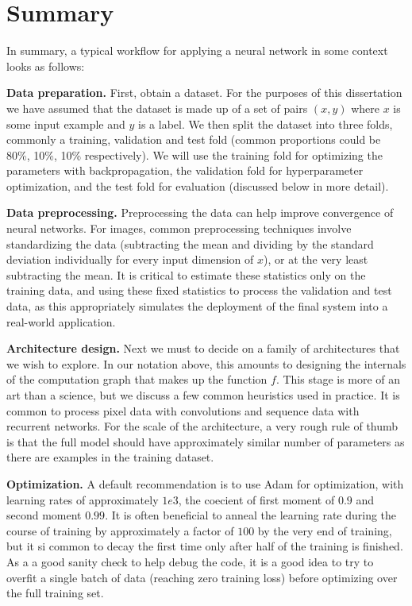 \section{Summary}
In summary, a typical workflow for applying a neural network in some context looks as follows:

\textbf{Data preparation.} First, obtain a dataset. For the purposes of this dissertation we have assumed that the dataset is made up of a set of pairs $\displaystyle (x, y)$ where $\displaystyle x$ is some input example and $\displaystyle y$ is a label. We then split the dataset into three folds, commonly a training, validation and test fold (common proportions could be 80\%, 10\%, 10\% respectively). We will use the training fold for optimizing the parameters with backpropagation, the validation fold for hyperparameter optimization, and the test fold for evaluation (discussed below in more detail).

\textbf{Data preprocessing.} Preprocessing the data can help improve convergence of neural networks. For images, common preprocessing techniques involve standardizing the data (subtracting the mean and dividing by the standard deviation individually for every input dimension of $\displaystyle x$), or at the very least subtracting the mean. It is critical to estimate these statistics only on the training data, and using these fixed statistics to process the validation and test data, as this appropriately simulates the deployment of the final system into a real-world application.

\textbf{Architecture design.} Next we must to decide on a family of architectures that we wish to explore. In our notation above, this amounts to designing the internals of the computation graph that makes up the function $\displaystyle f$. This stage is more of an art than a science, but we discuss a few common heuristics used in practice. It is common to process pixel data with convolutions and sequence data with recurrent networks. For the scale of the architecture, a very rough rule of thumb is that the full model should have approximately similar number of parameters as there are examples in the training dataset.

\textbf{Optimization.} A default recommendation is to use Adam \cite{article:Adam-optimization} for optimization, with learning rates of approximately $\displaystyle 1e3$, the coecient of first moment of $\displaystyle 0.9$ and second moment $\displaystyle 0.99$. It is often beneficial to anneal the learning rate during the course of training by approximately a factor of $\displaystyle 100$ by the very end of training, but it si common to decay the first time only after half of the training is finished. As a a good sanity check to help debug the code, it is a good idea to try to
overfit a single batch of data (reaching zero training loss) before optimizing over the full training set.

